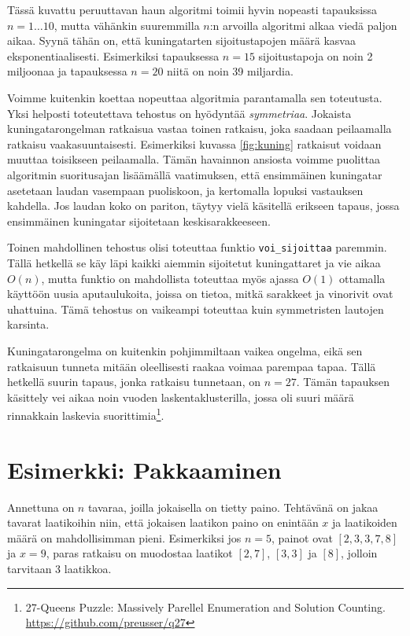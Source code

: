 Tässä kuvattu peruuttavan haun algoritmi toimii hyvin nopeasti
tapauksissa $n=1 \dots 10$,
mutta vähänkin suuremmilla $n$:n arvoilla
algoritmi alkaa viedä paljon aikaa.
Syynä tähän on, että kuningatarten sijoitustapojen
määrä kasvaa eksponentiaalisesti.
Esimerkiksi tapauksessa $n=15$ sijoitustapoja on
noin 2 miljoonaa ja tapauksessa $n=20$ niitä on noin 39 miljardia.

Voimme kuitenkin koettaa nopeuttaa algoritmia parantamalla
sen toteutusta.
Yksi helposti toteutettava tehostus on hyödyntää \emph{symmetriaa}.
Jokaista kuningatarongelman ratkaisua vastaa toinen ratkaisu,
joka saadaan peilaamalla ratkaisu vaakasuuntaisesti.
Esimerkiksi kuvassa \ref{fig:kuning} ratkaisut voidaan muuttaa
toisikseen peilaamalla.
Tämän havainnon ansiosta voimme puolittaa algoritmin suoritusajan
lisäämällä vaatimuksen, että ensimmäinen kuningatar asetetaan
laudan vasempaan puoliskoon, ja kertomalla lopuksi vastauksen kahdella.
Jos laudan koko on pariton, täytyy vielä käsitellä erikseen tapaus,
jossa ensimmäinen kuningatar sijoitetaan keskisarakkeeseen.

Toinen mahdollinen tehostus olisi toteuttaa funktio
\texttt{voi\_sijoittaa} paremmin.
Tällä hetkellä se käy läpi kaikki aiemmin sijoitetut kuningattaret
ja vie aikaa $O(n)$, mutta funktio on mahdollista toteuttaa myös
ajassa $O(1)$ ottamalla käyttöön uusia aputaulukoita, joissa on tietoa,
mitkä sarakkeet ja vinorivit ovat uhattuina.
Tämä tehostus on vaikeampi toteuttaa kuin symmetristen lautojen karsinta.

Kuningatarongelma on kuitenkin pohjimmiltaan vaikea ongelma,
eikä sen ratkaisuun tunneta mitään oleellisesti raakaa voimaa
parempaa tapaa.
Tällä hetkellä suurin tapaus, jonka ratkaisu tunnetaan, on $n=27$.
Tämän tapauksen käsittely vei aikaa noin vuoden laskentaklusterilla,
jossa oli suuri määrä rinnakkain laskevia
suorittimia\footnote{27-Queens Puzzle: Massively Parellel Enumeration and Solution Counting.
\url{https://github.com/preusser/q27}}.


\section{Esimerkki: Pakkaaminen}

Annettuna on $n$ tavaraa, joilla jokaisella on tietty paino.
Tehtävänä on jakaa tavarat laatikoihin niin,
että jokaisen laatikon paino on enintään $x$ ja
laatikoiden määrä on mahdollisimman pieni.
Esimerkiksi jos $n=5$, painot ovat $[2,3,3,7,8]$ ja $x=9$,
paras ratkaisu on muodostaa laatikot $[2,7]$, $[3,3]$ ja $[8]$,
jolloin tarvitaan 3 laatikkoa.

